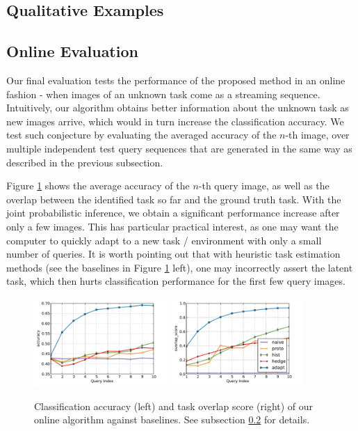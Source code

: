 \subsection{Qualitative Examples}


\subsection{Online Evaluation}\label{subsec:online}
Our final evaluation tests the performance of the proposed method in an online fashion - when images of an unknown task come as a streaming sequence. Intuitively, our algorithm obtains better information about the unknown task as new images arrive, which would in turn increase the classification accuracy. We test such conjecture by evaluating the averaged accuracy of the $n$-th image, over multiple independent test query sequences that are generated in the same way as described in the previous subsection.

Figure \ref{fig:online} shows the average accuracy of the $n$-th query image, as well as the overlap between the identified task so far and the ground truth task. With the joint probabilistic inference, we obtain a significant performance increase after only a few images. This has particular practical interest, as one may want the computer to quickly adapt to a new task / environment with only a small number of queries. It is worth pointing out that with heuristic task estimation methods (see the baselines in Figure \ref{fig:online} left), one may incorrectly assert the latent task, which then hurts classification performance for the first few query images.

\begin{figure}
    \centering
    \includegraphics[width=0.45\textwidth]{figs/taskadaptation/online_accuracy.pdf}%
    \includegraphics[width=0.45\textwidth]{figs/taskadaptation/online_overlap_score.pdf}
    \caption{Classification accuracy (left) and task overlap score (right) of our online algorithm against baselines. See subsection \ref{subsec:online} for details.}\label{fig:online}
\end{figure}

